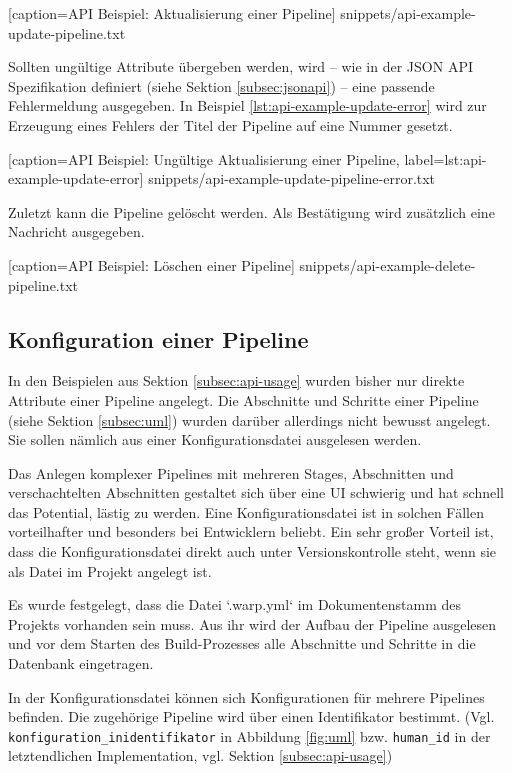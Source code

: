 
  [caption={API Beispiel: Aktualisierung einer Pipeline}]
  {snippets/api-example-update-pipeline.txt}

Sollten ungültige Attribute übergeben werden, wird – wie in der JSON API Spezifikation definiert (siehe Sektion \ref{subsec:jsonapi}) – eine passende Fehlermeldung ausgegeben. In Beispiel \ref{lst:api-example-update-error} wird zur Erzeugung eines Fehlers der Titel der Pipeline auf eine Nummer gesetzt.


  [caption={API Beispiel: Ungültige Aktualisierung einer Pipeline},
  label={lst:api-example-update-error}]
  {snippets/api-example-update-pipeline-error.txt}

Zuletzt kann die Pipeline gelöscht werden. Als Bestätigung wird zusätzlich eine Nachricht ausgegeben.


  [caption={API Beispiel: Löschen einer Pipeline}]
  {snippets/api-example-delete-pipeline.txt}

\subsection{Konfiguration einer Pipeline}

In den Beispielen aus Sektion \ref{subsec:api-usage} wurden bisher nur direkte Attribute einer Pipeline angelegt. Die Abschnitte und Schritte einer Pipeline (siehe Sektion \ref{subsec:uml}) wurden darüber allerdings nicht bewusst angelegt. Sie sollen nämlich aus einer Konfigurationsdatei ausgelesen werden.

Das Anlegen komplexer Pipelines mit mehreren Stages, Abschnitten und verschachtelten Abschnitten gestaltet sich über eine UI schwierig und hat schnell das Potential, lästig zu werden. Eine Konfigurationsdatei ist in solchen Fällen vorteilhafter und besonders bei Entwicklern beliebt. Ein sehr großer Vorteil ist, dass die Konfigurationsdatei direkt auch unter Versionskontrolle steht, wenn sie als Datei im Projekt angelegt ist.

Es wurde festgelegt, dass die Datei `.warp.yml` im Dokumentenstamm des Projekts vorhanden sein muss. Aus ihr wird der Aufbau der Pipeline ausgelesen und vor dem Starten des Build-Prozesses alle Abschnitte und Schritte in die Datenbank eingetragen.

In der Konfigurationsdatei können sich Konfigurationen für mehrere Pipelines befinden. Die zugehörige Pipeline wird über einen Identifikator bestimmt. (Vgl. \texttt{konfiguration\_\allowbreak inidentifikator} in Abbildung \ref{fig:uml} bzw. \texttt{human\_id} in der letztendlichen Implementation, vgl. Sektion \ref{subsec:api-usage})

